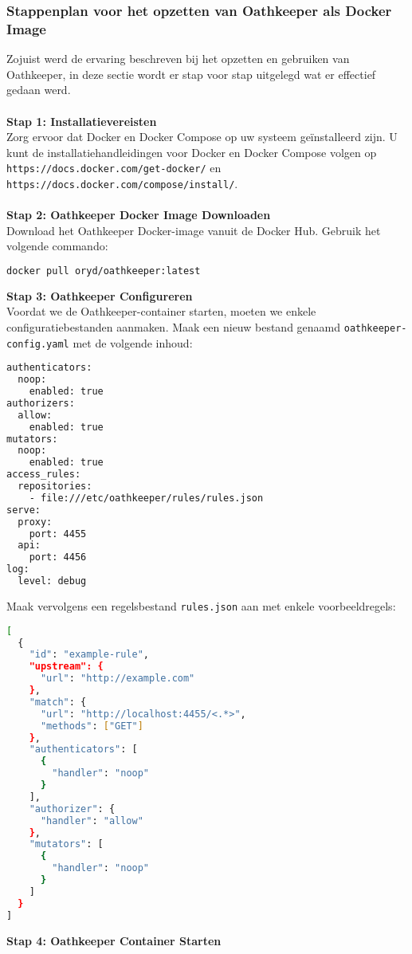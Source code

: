 \subsubsection{Stappenplan voor het opzetten van Oathkeeper als Docker Image}%
\label{subsubsec:oathkeeper-setup}
Zojuist werd de ervaring beschreven bij het opzetten en gebruiken van Oathkeeper, in deze sectie wordt er stap voor stap uitgelegd wat er effectief gedaan werd.\\\\
\textbf{Stap 1: Installatievereisten}\\
Zorg ervoor dat Docker en Docker Compose op uw systeem geïnstalleerd zijn. U kunt de installatiehandleidingen voor Docker en Docker Compose volgen op\\ \texttt{https://docs.docker.com/get-docker/} en \texttt{https://docs.docker.com/compose/install/}.\\\\
\textbf{Stap 2: Oathkeeper Docker Image Downloaden}\\
Download het Oathkeeper Docker-image vanuit de Docker Hub. Gebruik het volgende commando:
\begin{lstlisting}[language=bash]
docker pull oryd/oathkeeper:latest
\end{lstlisting}
\textbf{Stap 3: Oathkeeper Configureren}\\
Voordat we de Oathkeeper-container starten, moeten we enkele configuratiebestanden aanmaken. Maak een nieuw bestand genaamd \texttt{oathkeeper-config.yaml} met de volgende inhoud:
\begin{lstlisting}[language=bash]
authenticators:
  noop:
    enabled: true
authorizers:
  allow:
    enabled: true
mutators:
  noop:
    enabled: true
access_rules:
  repositories:
    - file:///etc/oathkeeper/rules/rules.json
serve:
  proxy:
    port: 4455
  api:
    port: 4456
log:
  level: debug
\end{lstlisting}
Maak vervolgens een regelsbestand \texttt{rules.json} aan met enkele voorbeeldregels:
\begin{lstlisting}[language=bash]
[
  {
    "id": "example-rule",
    "upstream": {
      "url": "http://example.com"
    },
    "match": {
      "url": "http://localhost:4455/<.*>",
      "methods": ["GET"]
    },
    "authenticators": [
      {
        "handler": "noop"
      }
    ],
    "authorizer": {
      "handler": "allow"
    },
    "mutators": [
      {
        "handler": "noop"
      }
    ]
  }
]
\end{lstlisting}
\textbf{Stap 4: Oathkeeper Container Starten}\\
